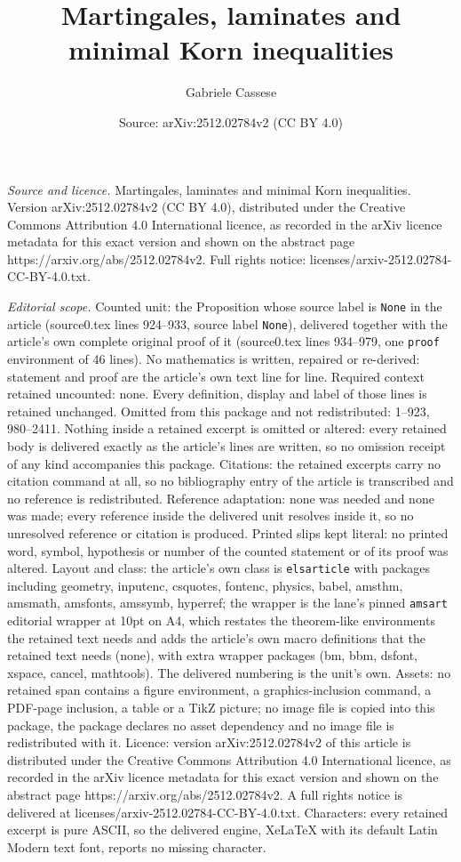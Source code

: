 \documentclass[10pt,a4paper]{amsart}
\title[Martingales, laminates and minimal Korn inequalities]{Martingales, laminates and minimal Korn inequalities}
\author{Gabriele Cassese}
\date{Source: arXiv:2512.02784v2 (CC BY 4.0)}
\begin{document}
\maketitle

\noindent\emph{Source and licence.} Martingales, laminates and minimal Korn inequalities. Version arXiv:2512.02784v2 (CC BY 4.0), distributed under the Creative Commons Attribution 4.0 International licence, as recorded in the arXiv licence metadata for this exact version and shown on the abstract page https://arxiv.org/abs/2512.02784v2. Full rights notice: licenses/arxiv-2512.02784-CC-BY-4.0.txt.\par\smallskip

\noindent\textit{Editorial scope.} Counted unit: the Proposition whose source label is \texttt{None} in the article (source0.tex lines 924--933, source label \texttt{None}), delivered together with the article's own complete original proof of it (source0.tex lines 934--979, one \texttt{proof} environment of 46 lines). No mathematics is written, repaired or re-derived: statement and proof are the article's own text line for line. Required context retained uncounted: none. Every definition, display and label of those lines is retained unchanged. Omitted from this package and not redistributed: 1--923, 980--2411. Nothing inside a retained excerpt is omitted or altered: every retained body is delivered exactly as the article's lines are written, so no omission receipt of any kind accompanies this package. Citations: the retained excerpts carry no citation command at all, so no bibliography entry of the article is transcribed and no reference is redistributed. Reference adaptation: none was needed and none was made; every reference inside the delivered unit resolves inside it, so no unresolved reference or citation is produced. Printed slips kept literal: no printed word, symbol, hypothesis or number of the counted statement or of its proof was altered. Layout and class: the article's own class is \texttt{elsarticle} with packages including geometry, inputenc, csquotes, fontenc, physics, babel, amsthm, amsmath, amsfonts, amssymb, hyperref; the wrapper is the lane's pinned \texttt{amsart} editorial wrapper at 10pt on A4, which restates the theorem-like environments the retained text needs and adds the article's own macro definitions that the retained text needs (none), with extra wrapper packages (bm, bbm, dsfont, xspace, cancel, mathtools). The delivered numbering is the unit's own. Assets: no retained span contains a figure environment, a graphics-inclusion command, a PDF-page inclusion, a table or a TikZ picture; no image file is copied into this package, the package declares no asset dependency and no image file is redistributed with it. Licence: version arXiv:2512.02784v2 of this article is distributed under the Creative Commons Attribution 4.0 International licence, as recorded in the arXiv licence metadata for this exact version and shown on the abstract page https://arxiv.org/abs/2512.02784v2. A full rights notice is delivered at licenses/arxiv-2512.02784-CC-BY-4.0.txt. Characters: every retained excerpt is pure ASCII, so the delivered engine, XeLaTeX with its default Latin Modern text font, reports no missing character.
\end{document}
